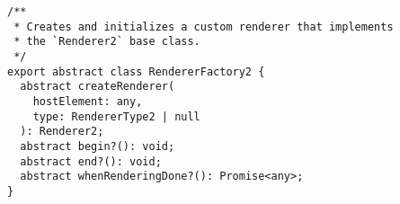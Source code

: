 \begin{verbatim}
/**
 * Creates and initializes a custom renderer that implements
 * the `Renderer2` base class.
 */
export abstract class RendererFactory2 {
  abstract createRenderer(
    hostElement: any,
    type: RendererType2 | null
  ): Renderer2;
  abstract begin?(): void;
  abstract end?(): void;
  abstract whenRenderingDone?(): Promise<any>;
}
\end{verbatim}
